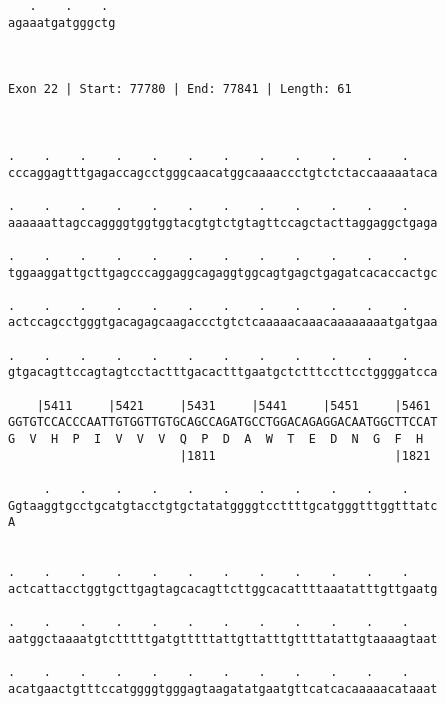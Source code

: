 \documentclass{article}
\begin{document}
\begin{Verbatim}
   .    .    . 
agaaatgatgggctg
               
               
 
Exon 22 | Start: 77780 | End: 77841 | Length: 61



.    .    .    .    .    .    .    .    .    .    .    .    
cccaggagtttgagaccagcctgggcaacatggcaaaaccctgtctctaccaaaaataca
                                                            
.    .    .    .    .    .    .    .    .    .    .    .    
aaaaaattagccaggggtggtggtacgtgtctgtagttccagctacttaggaggctgaga
                                                            
.    .    .    .    .    .    .    .    .    .    .    .    
tggaaggattgcttgagcccaggaggcagaggtggcagtgagctgagatcacaccactgc
                                                            
.    .    .    .    .    .    .    .    .    .    .    .    
actccagcctgggtgacagagcaagaccctgtctcaaaaacaaacaaaaaaaatgatgaa
                                                            
.    .    .    .    .    .    .    .    .    .    .    .    
gtgacagttccagtagtcctactttgacactttgaatgctctttccttcctggggatcca
                                                            
    |5411     |5421     |5431     |5441     |5451     |5461 
GGTGTCCACCCAATTGTGGTTGTGCAGCCAGATGCCTGGACAGAGGACAATGGCTTCCAT
G  V  H  P  I  V  V  V  Q  P  D  A  W  T  E  D  N  G  F  H  
                        |1811                         |1821 
  
     .    .    .    .    .    .    .    .    .    .    .    
Ggtaaggtgcctgcatgtacctgtgctatatggggtccttttgcatgggtttggtttatc
A                                                           
                                                            
  
.    .    .    .    .    .    .    .    .    .    .    .    
actcattacctggtgcttgagtagcacagttcttggcacattttaaatatttgttgaatg
                                                            
.    .    .    .    .    .    .    .    .    .    .    .    
aatggctaaaatgtctttttgatgtttttattgttatttgttttatattgtaaaagtaat
                                                            
.    .    .    .    .    .    .    .    .    .    .    .    
acatgaactgtttccatggggtgggagtaagatatgaatgttcatcacaaaaacataaat
                                                            

\end{Verbatim}
\end{document}
